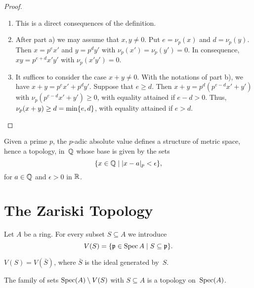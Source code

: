 \begin{proof}${}$
    \begin{enumerate}[\rm a)]
        \item This is a direct consequences of the definition.
        
        \item After part a) we may assume that $x,y\ne0$. Put $e=\nu_p(x)$ and $d=\nu_p(y)$. Then $x=p^ex'$ and $y=p^dy'$ with $\nu_p(x')=\nu_p(y')=0$. In consequence, $xy=p^{e+d}x'y'$ with $\nu_p(x'y')=0$.

        \item It suffices to consider the case $x+y\ne0$. With the notations of part b), we have $x+y=p^ex'+p^dy'$. Suppose that $e\ge d$. Then $x+y=p^d(p^{e-d}x'+y')$ with $\nu_p(p^{e-d}x'+y')\ge0$, with equality attained if $e-d>0$. Thus, $\nu_p(x+y)\ge d=\min\{e,d\}$, with equality attained if $e>d$.
    \end{enumerate}
\end{proof}

\begin{defn}
    Given a prime $p$, the $p$-adic absolute value defines a structure of metric space, hence a topology, in~$\mathbb{Q}$ whose base is given by the sets
    $$
        \{x\in\mathbb{Q}\mid |x-a|_p<\epsilon\},
    $$
    for $a\in\mathbb{Q}$ and $\epsilon>0$ in $\mathbb{R}$.
\end{defn}

\section{The Zariski Topology}

Let $A$ be a ring. For every subset $S\subseteq A$ we introduce
$$
    V(S) = \{\mathfrak p\in\operatorname{Spec} A\mid S\subseteq\mathfrak p\}.
$$
\begin{rem}
    $V(S)=V(\bar S)$, where $\bar S$ is the ideal generated by~$S$.
\end{rem}

\begin{thm}\label{thm:Zariski-topology-properties}
    The family of sets\/ $\operatorname{Spec}(A)\setminus V(S)$ with\/ $S\subseteq A$ is a topology on\/~$\operatorname{Spec}(A)$.
\end{thm}


